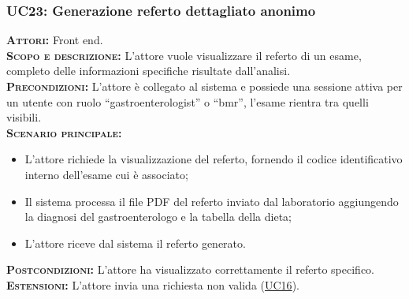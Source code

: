 \subsubsection{UC23: Generazione referto dettagliato anonimo}
\label{sec:UC23}
\textsc{\textbf{Attori:}} Front end.\\
\textsc{\textbf{Scopo e descrizione:}} L'attore vuole visualizzare il referto di un esame, completo delle informazioni specifiche risultate dall'analisi.\\
\textsc{\textsc{\textbf{Precondizioni:}}} L'attore è collegato al sistema e possiede una sessione attiva per un utente con ruolo ``gastroenterologist'' o ``bmr'', l'esame rientra tra quelli visibili.\\
\textsc{\textbf{Scenario principale:}}
\begin{itemize}
    \item L'attore richiede la visualizzazione del referto, fornendo il codice identificativo interno dell'esame cui è associato;
    \item Il sistema processa il file PDF del referto inviato dal laboratorio aggiungendo la diagnosi del gastroenterologo e la tabella della dieta;
    \item L'attore riceve dal sistema il referto generato.
\end{itemize}
\textsc{\textbf{Postcondizioni:}} L'attore ha visualizzato correttamente il referto specifico.\\
\textsc{\textbf{Estensioni:}} L'attore invia una richiesta non valida (\hyperref[sec:UC16]{UC16}).

